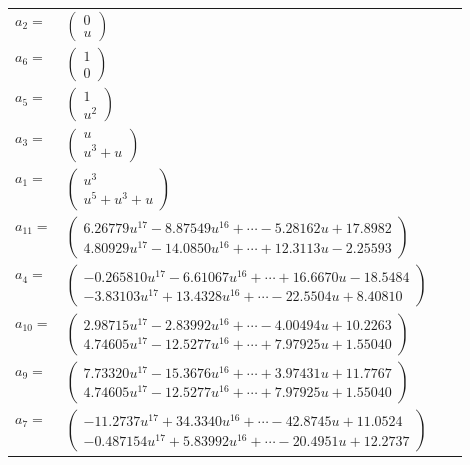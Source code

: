\documentclass[1p]{elsarticle_modified}
\theoremstyle{definition}
\begin{document}
\begin{tabular}{m{7pt} m{180pt} m{7pt} m{180pt} }
\flushright $a_{2}=$&$\begin{pmatrix}0\\u\end{pmatrix}$ \\
\flushright $a_{6}=$&$\begin{pmatrix}1\\0\end{pmatrix}$ \\
\flushright $a_{5}=$&$\begin{pmatrix}1\\u^2\end{pmatrix}$ \\
\flushright $a_{3}=$&$\begin{pmatrix}u\\u^3+u\end{pmatrix}$ \\
\flushright $a_{1}=$&$\begin{pmatrix}u^3\\u^5+u^3+u\end{pmatrix}$ \\
\flushright $a_{11}=$&$\begin{pmatrix}6.26779 u^{17}-8.87549 u^{16}+\cdots-5.28162 u+17.8982\\4.80929 u^{17}-14.0850 u^{16}+\cdots+12.3113 u-2.25593\end{pmatrix}$ \\
\flushright $a_{4}=$&$\begin{pmatrix}-0.265810 u^{17}-6.61067 u^{16}+\cdots+16.6670 u-18.5484\\-3.83103 u^{17}+13.4328 u^{16}+\cdots-22.5504 u+8.40810\end{pmatrix}$ \\
\flushright $a_{10}=$&$\begin{pmatrix}2.98715 u^{17}-2.83992 u^{16}+\cdots-4.00494 u+10.2263\\4.74605 u^{17}-12.5277 u^{16}+\cdots+7.97925 u+1.55040\end{pmatrix}$ \\
\flushright $a_{9}=$&$\begin{pmatrix}7.73320 u^{17}-15.3676 u^{16}+\cdots+3.97431 u+11.7767\\4.74605 u^{17}-12.5277 u^{16}+\cdots+7.97925 u+1.55040\end{pmatrix}$ \\
\flushright $a_{7}=$&$\begin{pmatrix}-11.2737 u^{17}+34.3340 u^{16}+\cdots-42.8745 u+11.0524\\-0.487154 u^{17}+5.83992 u^{16}+\cdots-20.4951 u+12.2737\end{pmatrix}$ \\

\end{tabular}
\end{document}
